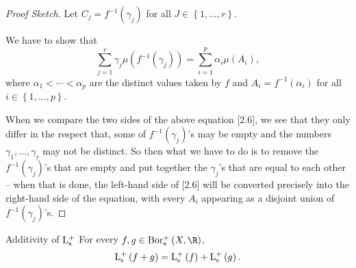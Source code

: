 \documentclass[pmath450]{subfiles}
\begin{document}
    \begin{proof}[Proof Sketch]
        Let $C_j = f^{-1}\left( \gamma_j \right)$ for all $J\in\left\lbrace 1,\ldots,r \right\rbrace$.

        We have to show that
        \begin{equation}
            \sum^{r}_{j=1}\gamma_j\mu\left( f^{-1}\left( \gamma_j \right) \right) = \sum^{p}_{i=1}\alpha_i \mu\left( A_i \right),
        \end{equation}
        where $\alpha_1<\cdots<\alpha_p$ are the distinct values taken by $f$ and $A_i = f^{-1}\left( \alpha_i \right)$ for all $i\in\left\lbrace 1,\ldots,p \right\rbrace$.

        When we compare the two sides of the above equation [2.6], we see that they only differ in the respect that, some of $f^{-1}\left( \gamma_j \right)$'s may be empty and the numbers $\gamma_1,\ldots,\gamma_r$ may not be distinct. So then what we have to do is to remove the $f^{-1}\left( \gamma_j \right)$'s that are empty and put together the $\gamma_j$'s that are equal to each other -- when that is done, the left-hand side of [2.6] will be converted precisely into the right-hand side of the equation, with every $A_i$ appearing as a disjoint union of $f^{-1}\left( \gamma_j \right)$'s.
    \end{proof}

    \begin{prop}{Additivity of $\operatorname{L^+_s}$}
        For every $f,g\in\borpluss\left( X,\R \right)$,
        \begin{equation*}
            \operatorname{L^+_s}\left( f+g \right) = \operatorname{L^+_s}\left( f \right)+\operatorname{L^+_s}\left( g \right).
        \end{equation*}
    \end{prop}
\end{document}
